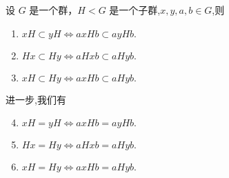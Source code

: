 \documentclass[../../main.tex]{subfiles}
\begin{document}
\begin{lemma}\label{lemma:两个相等的陪集同时左乘相同元素保持等号}
设 \(G\) 是一个群，\(H < G\) 是一个子群,$x,y,a,b\in G$,则
\begin{enumerate}[(1)]
\item $xH \subset yH \Leftrightarrow axHb \subset ayHb.$

\item $Hx\subset Hy \Leftrightarrow aHxb\subset aHyb.$


\item $xH\subset Hy \Leftrightarrow axHb\subset aHyb.$
\end{enumerate}
进一步,我们有
\begin{enumerate}[(1)]\setcounter{enumi}{3}
\item $xH=yH \Leftrightarrow axHb=ayHb.$

\item $Hx=Hy \Leftrightarrow aHxb=aHyb.$


\item $xH=Hy \Leftrightarrow axHb=aHyb.$
\end{enumerate}
\end{lemma}
\end{document}
